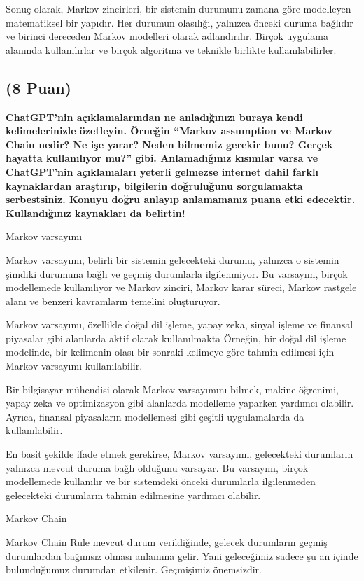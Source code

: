 \documentclass[11pt]{article}
\begin{document}
Sonuç olarak, Markov zincirleri, bir sistemin durumunu zamana göre modelleyen matematiksel bir yapıdır. Her durumun olasılığı, yalnızca önceki duruma bağlıdır ve birinci dereceden Markov modelleri olarak adlandırılır. Birçok uygulama alanında kullanılırlar ve birçok algoritma ve teknikle birlikte kullanılabilirler.

\subsection{(8 Puan)} \textbf{ChatGPT’nin açıklamalarından ne anladığınızı buraya kendi kelimelerinizle özetleyin. Örneğin ``Markov assumption ve Markov Chain nedir? Ne işe yarar? Neden bilmemiz gerekir bunu? Gerçek hayatta kullanılıyor mu?'' gibi. Anlamadığınız kısımlar varsa ve ChatGPT’nin açıklamaları yeterli gelmezse internet dahil farklı kaynaklardan araştırıp, bilgilerin doğruluğunu sorgulamakta serbestsiniz. Konuyu doğru anlayıp anlamamanız puana etki edecektir. Kullandığınız kaynakları da belirtin!}

Markov varsayımı

Markov varsayımı, belirli bir sistemin gelecekteki durumu, yalnızca o sistemin şimdiki durumuna bağlı ve geçmiş durumlarla ilgilenmiyor. Bu varsayım, birçok modellemede kullanılıyor ve Markov zinciri, Markov karar süreci, Markov rastgele alanı ve benzeri kavramların temelini oluşturuyor.

Markov varsayımı, özellikle doğal dil işleme, yapay zeka, sinyal işleme ve finansal piyasalar gibi alanlarda aktif olarak kullanılmakta Örneğin, bir doğal dil işleme modelinde, bir kelimenin olası bir sonraki kelimeye göre tahmin edilmesi için Markov varsayımı kullanılabilir.

Bir bilgisayar mühendisi olarak Markov varsayımını bilmek, makine öğrenimi, yapay zeka ve optimizasyon gibi alanlarda modelleme yaparken yardımcı olabilir. Ayrıca, finansal piyasaların modellemesi gibi çeşitli uygulamalarda da kullanılabilir.

En basit şekilde ifade etmek gerekirse, Markov varsayımı, gelecekteki durumların yalnızca mevcut duruma bağlı olduğunu varsayar. Bu varsayım, birçok modellemede kullanılır ve bir sistemdeki önceki durumlarla ilgilenmeden gelecekteki durumların tahmin edilmesine yardımcı olabilir.

Markov Chain

Markov Chain Rule mevcut durum verildiğinde, gelecek durumların geçmiş durumlardan bağımsız olması anlamına gelir. Yani geleceğimiz sadece şu an içinde bulunduğumuz durumdan etkilenir. Geçmişimiz önemsizdir.
\end{document}
